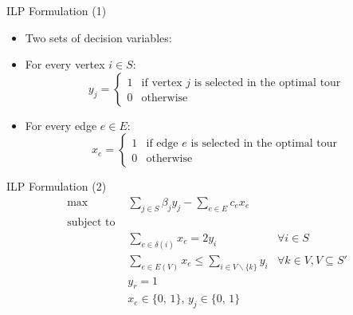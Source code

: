 \begin{frame}[t]{ILP Formulation (1)}
    \begin{itemize}
        \item<1-> Two sets of decision variables:
        \item<2-> For every vertex $i \in S$:
        \[
            y_j =
                \begin{cases}
                    1 & \text{if vertex $j$ is selected in the optimal tour} \\
                    0 & \text{otherwise}
                \end{cases}
        \]       
        \item<3-> For every edge $e \in E$:
        \[
            x_e =
                \begin{cases}
                    1 & \text{if edge $e$ is selected in the optimal tour} \\
                    0 & \text{otherwise}
                \end{cases}
        \]        
    \end{itemize}
\end{frame}

\begin{frame}[t]{ILP Formulation (2)}
    \begin{align} 
        \text {max } \label{pctsp_obj}     & \sum_{j\in S} \beta_j y_j  -     \sum_{e\in E} c_e x_e &
        \\
        \text{subject to } \nonumber    &  & \\
        \label{const:pctsp1}               & \sum_{e \in \delta(i)} x_e = 2 y_{i}  & \forall i \in S \\
        \label{const:pctsp2}               & \sum_{e \in E(V) } x_e \leq \sum_{i \in V \backslash\{ k \}} y_{i} & \forall k \in V, V\subseteq S' \\
        \label{const:pctsp3}               & y_r = 1 \\
        \label{const:pctsp4}               & x_e \in \{0, \, 1\}, \, y_j \in \{0, \, 1\}  
    \end{align}
\end{frame}

